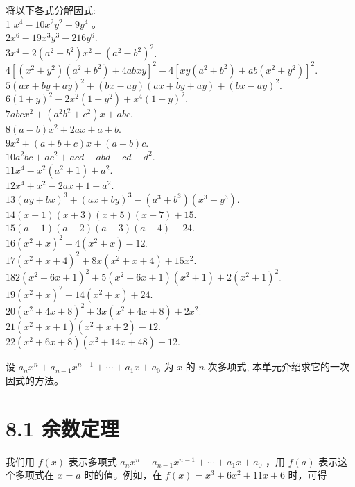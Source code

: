 \documentclass[10pt]{article}
\begin{document}
将以下各式分解因式:\\
1 $x^{4}-10 x^{2} y^{2}+9 y^{4}$ 。\\
$2 x^{6}-19 x^{3} y^{3}-216 y^{6}$.\\
$3 x^{4}-2\left(a^{2}+b^{2}\right) x^{2}+\left(a^{2}-b^{2}\right)^{2}$.\\
$4\left[\left(x^{2}+y^{2}\right)\left(a^{2}+b^{2}\right)+4 a b x y\right]^{2}-4\left[x y\left(a^{2}+b^{2}\right)+a b\left(x^{2}+y^{2}\right)\right]^{2}$.\\
$5(a x+b y+a y)^{2}+(b x-a y)(a x+b y+a y)+(b x-a y)^{2}$.\\
$6(1+y)^{2}-2 x^{2}\left(1+y^{2}\right)+x^{4}(1-y)^{2}$.\\
$7 a b c x^{2}+\left(a^{2} b^{2}+c^{2}\right) x+a b c$.\\
$8(a-b) x^{2}+2 a x+a+b$.\\
$9 x^{2}+(a+b+c) x+(a+b) c$.\\
$10 a^{2} b c+a c^{2}+a c d-a b d-c d-d^{2}$.\\
$11 x^{4}-x^{2}\left(a^{2}+1\right)+a^{2}$.\\
$12 x^{4}+x^{2}-2 a x+1-a^{2}$.\\
$13(a y+b x)^{3}+(a x+b y)^{3}-\left(a^{3}+b^{3}\right)\left(x^{3}+y^{3}\right)$.\\
$14(x+1)(x+3)(x+5)(x+7)+15$.\\
$15(a-1)(a-2)(a-3)(a-4)-24$.\\
$16\left(x^{2}+x\right)^{2}+4\left(x^{2}+x\right)-12$.\\
$17\left(x^{2}+x+4\right)^{2}+8 x\left(x^{2}+x+4\right)+15 x^{2}$.\\
$182\left(x^{2}+6 x+1\right)^{2}+5\left(x^{2}+6 x+1\right)\left(x^{2}+1\right)+2\left(x^{2}+1\right)^{2}$.\\
$19\left(x^{2}+x\right)^{2}-14\left(x^{2}+x\right)+24$.\\
$20\left(x^{2}+4 x+8\right)^{2}+3 x\left(x^{2}+4 x+8\right)+2 x^{2}$.\\
$21\left(x^{2}+x+1\right)\left(x^{2}+x+2\right)-12$.\\
$22\left(x^{2}+6 x+8\right)\left(x^{2}+14 x+48\right)+12$.

设 $a_{n} x^{n}+a_{n-1} x^{n-1}+\cdots+a_{1} x+a_{0}$ 为 $x$ 的 $n$ 次多项式, 本单元介绍求它的一次因式的方法。

\section*{8.1 余数定理}
我们用 $f(x)$ 表示多项式 $a_{n} x^{n}+a_{n-1} x^{n-1}+\cdots+a_{1} x+a_{0}$ ，用 $f(a)$ 表示这个多项式在 $x=a$ 时的值。例如，在 $f(x)=x^{3}+6 x^{2}+11 x+6$ 时，可得
\end{document}
